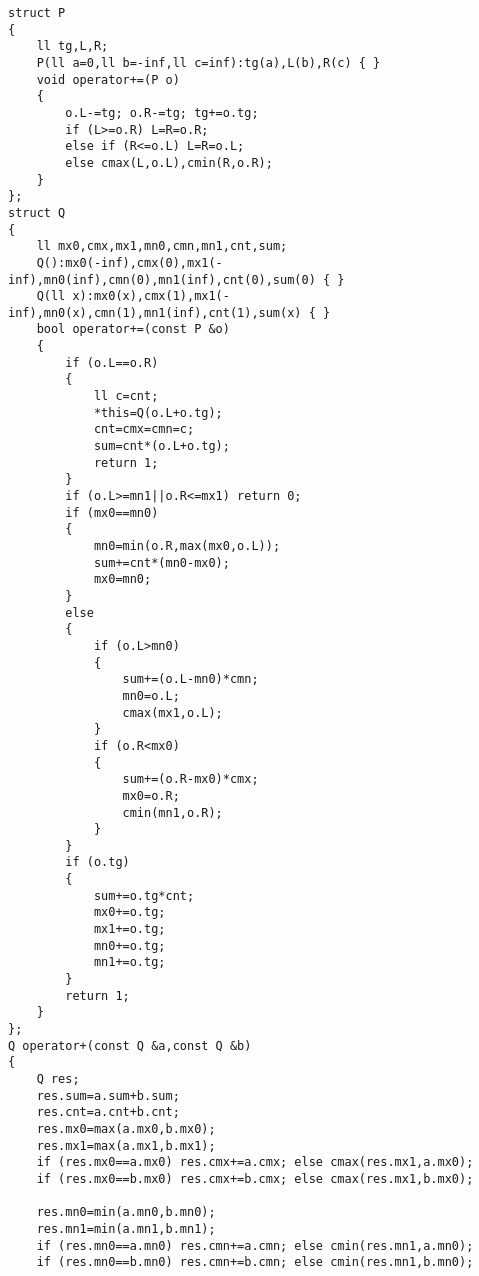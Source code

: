 \documentclass[12pt]{ctexart}
\begin{document}
\begin{lstlisting}
struct P
{
	ll tg,L,R;
	P(ll a=0,ll b=-inf,ll c=inf):tg(a),L(b),R(c) { }
	void operator+=(P o)
	{
		o.L-=tg; o.R-=tg; tg+=o.tg;
		if (L>=o.R) L=R=o.R;
		else if (R<=o.L) L=R=o.L;
		else cmax(L,o.L),cmin(R,o.R);
	}
};
struct Q
{
	ll mx0,cmx,mx1,mn0,cmn,mn1,cnt,sum;
	Q():mx0(-inf),cmx(0),mx1(-inf),mn0(inf),cmn(0),mn1(inf),cnt(0),sum(0) { }
	Q(ll x):mx0(x),cmx(1),mx1(-inf),mn0(x),cmn(1),mn1(inf),cnt(1),sum(x) { }
	bool operator+=(const P &o)
	{
		if (o.L==o.R)
		{
			ll c=cnt;
			*this=Q(o.L+o.tg);
			cnt=cmx=cmn=c;
			sum=cnt*(o.L+o.tg);
			return 1;
		}
		if (o.L>=mn1||o.R<=mx1) return 0;
		if (mx0==mn0)
		{
			mn0=min(o.R,max(mx0,o.L));
			sum+=cnt*(mn0-mx0);
			mx0=mn0;
		}
		else
		{
			if (o.L>mn0)
			{
				sum+=(o.L-mn0)*cmn;
				mn0=o.L;
				cmax(mx1,o.L);
			}
			if (o.R<mx0)
			{
				sum+=(o.R-mx0)*cmx;
				mx0=o.R;
				cmin(mn1,o.R);
			}
		}
		if (o.tg)
		{
			sum+=o.tg*cnt;
			mx0+=o.tg;
			mx1+=o.tg;
			mn0+=o.tg;
			mn1+=o.tg;
		}
		return 1;
	}
};
Q operator+(const Q &a,const Q &b)
{
	Q res;
	res.sum=a.sum+b.sum;
	res.cnt=a.cnt+b.cnt;
	res.mx0=max(a.mx0,b.mx0);
	res.mx1=max(a.mx1,b.mx1);
	if (res.mx0==a.mx0) res.cmx+=a.cmx; else cmax(res.mx1,a.mx0);
	if (res.mx0==b.mx0) res.cmx+=b.cmx; else cmax(res.mx1,b.mx0);

	res.mn0=min(a.mn0,b.mn0);
	res.mn1=min(a.mn1,b.mn1);
	if (res.mn0==a.mn0) res.cmn+=a.cmn; else cmin(res.mn1,a.mn0);
	if (res.mn0==b.mn0) res.cmn+=b.cmn; else cmin(res.mn1,b.mn0);


\end{lstlisting}
\end{document}
